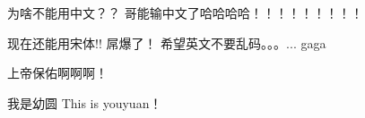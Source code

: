 \documentclass{article}
\begin{document}
\begin{CJK}{UTF8}{wqy-zenhei}
为啥不能用中文？？
哥能输中文了哈哈哈哈！！！！！！！！！
\end{CJK}
\begin{CJK}{UTF8}{song}
现在还能用宋体!! 屌爆了！
希望英文不要乱码。。。...
gaga
\end{CJK}
\begin{CJK}{UTF8}{kai}
上帝保佑啊啊啊！
\end{CJK}
\begin{CJK}{UTF8}{youyuan}
我是幼圆  This is youyuan！
\end{CJK}
\end{document}
